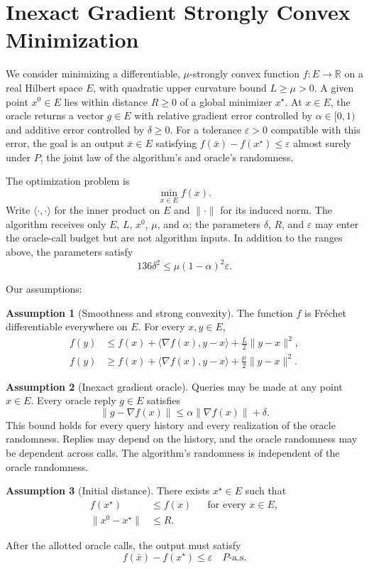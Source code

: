 \documentclass[10pt]{article}
\theoremstyle{definition}
\newtheorem{assumption}{Assumption}
\begin{document}
\section*{Inexact Gradient Strongly Convex Minimization}
We consider minimizing a differentiable, $\mu$-strongly convex function $f:E\to\mathbb{R}$ on a real Hilbert space $E$, with quadratic upper curvature bound $L\geq\mu>0$. A given point $x^0\in E$ lies within distance $R\geq0$ of a global minimizer $x^\star$. At $x\in E$, the oracle returns a vector $g\in E$ with relative gradient error controlled by $\alpha\in[0,1)$ and additive error controlled by $\delta\geq0$. For a tolerance $\varepsilon>0$ compatible with this error, the goal is an output $\bar{x}\in E$ satisfying $f(\bar{x})-f(x^\star)\leq\varepsilon$ almost surely under $P$, the joint law of the algorithm's and oracle's randomness.

The optimization problem is
\[
\min_{x\in E} f(x).
\]
Write $\langle\cdot,\cdot\rangle$ for the inner product on $E$ and $\|\cdot\|$ for its induced norm. The algorithm receives only $E$, $L$, $x^0$, $\mu$, and $\alpha$; the parameters $\delta$, $R$, and $\varepsilon$ may enter the oracle-call budget but are not algorithm inputs. In addition to the ranges above, the parameters satisfy
\[
136\delta^2\leq\mu(1-\alpha)^2\varepsilon.
\]

Our assumptions:
\begin{assumption}[Smoothness and strong convexity]
The function $f$ is Fr\'echet differentiable everywhere on $E$. For every $x,y\in E$,
\[
\begin{aligned}
f(y)&\leq f(x)+\langle\nabla f(x),y-x\rangle
       +\frac{L}{2}\|y-x\|^2,\\
f(y)&\geq f(x)+\langle\nabla f(x),y-x\rangle
       +\frac{\mu}{2}\|y-x\|^2.
\end{aligned}
\]
\end{assumption}

\begin{assumption}[Inexact gradient oracle]
Queries may be made at any point $x\in E$. Every oracle reply $g\in E$ satisfies
\[
\|g-\nabla f(x)\|\leq\alpha\|\nabla f(x)\|+\delta.
\]
This bound holds for every query history and every realization of the oracle randomness. Replies may depend on the history, and the oracle randomness may be dependent across calls. The algorithm's randomness is independent of the oracle randomness.
\end{assumption}

\begin{assumption}[Initial distance]
There exists $x^\star\in E$ such that
\[
\begin{aligned}
f(x^\star)&\leq f(x) &&\text{for every }x\in E,\\
\|x^0-x^\star\|&\leq R.
\end{aligned}
\]
\end{assumption}

After the allotted oracle calls, the output must satisfy
\[
f(\bar{x})-f(x^\star)\leq\varepsilon
\quad P\text{-a.s.}
\]
\end{document}
